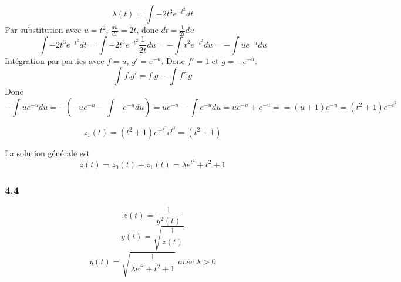 \documentclass[]{book}
\theoremstyle{definition}
\begin{document}
$$\lambda(t) = \int{-2t^3e^{-t^2}dt}$$
Par substitution avec $u = t^2$, $\frac{du}{dt} = 2t$, donc $dt=\frac{1}{2t}du$
$$\int{-2t^3e^{-t^2}dt} = \int{-2t^3e^{-t^2}\frac{1}{2t}du} = -\int{t^2e^{-t^2}du} = -\int{ue^{-u} du}$$
Int\'egration par parties avec $f=u$, $g'=e^{-u}$. Donc $f'=1$ et $g=-e^{-u}$.
$$\int{f.g'} = f.g - \int{f'.g}$$
Donc
$$-\int{ue^{-u} du} = -(-ue^{-u} - \int{-e^{-u}du}) = ue^{-u} - \int{e^{-u}du} = ue^{-u} + e^{-u} = =(u+1)e^{-u} = (t^2+1)e^{-t^2}$$

$$z_1(t) = (t^2+1)e^{-t^2}e^{t^2} = (t^2+1)$$

La solution g\'en\'erale est
$$z(t) = z_0(t) + z_1(t) = \lambda e^{t^2} + t^2 + 1$$

\subsubsection*{4.4}
$$z(t) = \frac{1}{y^2(t)}$$
$$y(t) = \sqrt{\frac{1}{z(t)}}$$
$$y(t) = \sqrt{\frac{1}{\lambda e^{t^2} + t^2 + 1}}\; avec\; \lambda > 0$$
\end{document}
